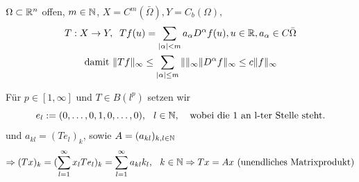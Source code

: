 \begin{beispiel}[Differentialoperatoren]
$\Omega \subset \mathbb{R}^n$ offen, $m \in \mathbb{N}$, $X = C^{m}(\bar \Omega), Y = C_{b}(\Omega),$
\begin{align*}
T:X \rightarrow Y, & \hspace{0.25cm} Tf(u) = \sum_{|\alpha| < m} a_{\alpha} D^{\alpha} f(u), u \in \mathbb{R}, a_{\alpha} \in C{\bar \Omega} \\
  \text{damit } & \| Tf \|_{\infty} \leq \sum_{|\alpha| \leq m} \| \|_{\infty} \| D^{\alpha} f \|_{\infty} \leq c \|f\|_{\infty}
 \end{align*}
\end{beispiel}

\begin{beispiel}[Matrizenmultiplikation]
Für $p \in [1, \infty]$ und $T \in B(l^{p})$ setzen wir 
\[ e_{l} := (0, \dotsc, 0, 1, 0, \dotsc, 0), \hspace{0.25cm} l \in \mathbb{N}, \hspace{0.25cm} \text{ wobei die 1 an l-ter Stelle steht.} \]
und $a_{kl} = (T e_{l})_{k}$, sowie $A = (a_{kl})_{k,l \in \mathbb{N}}$
\[
	\Rightarrow (Tx)_{k} = (\sum_{l = 1}^{\infty} x_{l} T e_{l})_{k} = \sum_{ l = 1}^{\infty} a_{kl}k_{l}, \hspace{0.25cm} k \in \mathbb{N} \\
	\Rightarrow T x = A x \text{ (unendliches Matrixprodukt)}
\]


\end{beispiel}
